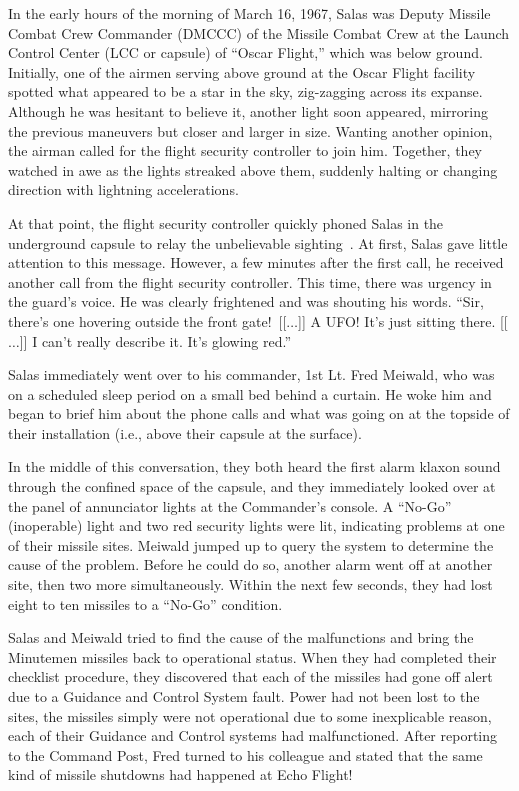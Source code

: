In the early hours of the morning of March 16, 1967, Salas was Deputy Missile Combat Crew Commander (DMCCC) of the Missile Combat Crew
at the Launch Control Center (LCC or capsule) of ``Oscar Flight,'' which was below ground.
Initially, one of the airmen serving above ground at the Oscar Flight facility
spotted what appeared to be a star in the sky, zig-zagging across its expanse.
Although he was hesitant to believe it, another light soon appeared, mirroring the previous maneuvers but closer and larger in size.
Wanting another opinion, the airman called for the flight security controller to join him.
Together, they watched in awe as the lights streaked above them,
suddenly halting or changing direction with lightning accelerations.

At that point, the flight security controller quickly phoned Salas in the underground capsule to relay the unbelievable sighting~\cite{Klotz2005Feb}.
At first, Salas gave little attention to this message.
However, a few minutes after the first call, he received another call from the flight security controller.
This time, there was urgency in the guard's voice. He was clearly frightened and was shouting his words.
``Sir, there's one hovering outside the front gate!~[[$\ldots$]]
A UFO! It's just sitting there. [[$\ldots$]]
I can't really describe it. It's glowing red.''

Salas immediately went over to his commander, 1st Lt. Fred Meiwald, who was on a scheduled sleep period on a small bed behind a curtain.
He woke him and began to brief him about the phone calls and what was going on at the topside of their installation
(i.e., above their capsule at the surface).

In the middle of this conversation, they both heard the first alarm klaxon sound through the confined space of the capsule,
 and they immediately looked over at the panel of annunciator lights at the Commander's console.
A ``No-Go'' (inoperable) light and two red security lights were lit, indicating problems at one of their missile sites.
Meiwald jumped up to query the system to determine the cause of the problem.
Before he could do so, another alarm went off at another site,
then two more simultaneously.
Within the next few seconds, they had lost eight to ten missiles to a ``No-Go'' condition.

Salas and Meiwald tried to find the cause of the malfunctions and bring the Minutemen missiles back to operational status.
When they had completed their checklist procedure, they discovered that each of the missiles had gone off alert due to a Guidance and Control System fault. Power had not been lost to the sites, the missiles simply were not operational due to some inexplicable reason, each of their Guidance and Control systems had malfunctioned. After reporting to the Command Post, Fred turned to his colleague
and stated that the same kind of missile shutdowns had happened at Echo Flight!

